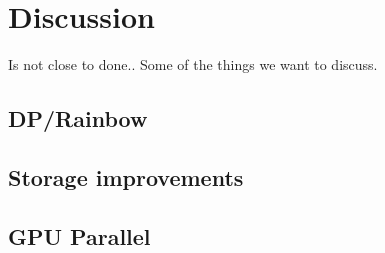 \chapter{Discussion}
\label{ch:disc}

Is not close to done.. Some of the things we want to discuss.

\section{DP/Rainbow}
\section{Storage improvements}
\section{GPU Parallel}

